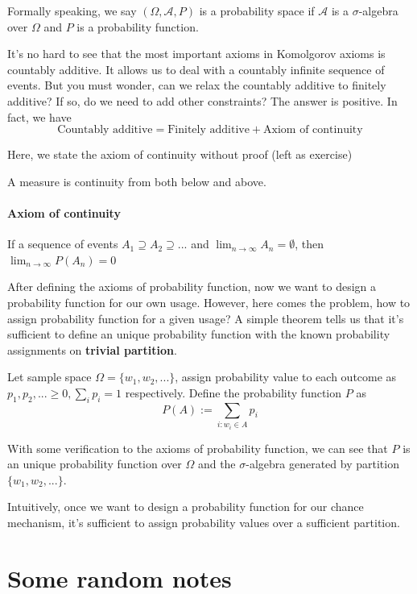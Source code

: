 \documentclass[Probability Theory.tex]{subfiles}
\begin{document}
Formally speaking, we say $(\Omega,\mathcal{A},P)$ is a probability space if $\mathcal{A}$ is a $\sigma$-algebra over $\Omega$ and $P$ is a probability function.

It's no hard to see that the most important axioms in Komolgorov axioms is countably additive. It allows us to deal with a countably infinite sequence of events. But you must wonder, can we relax the countably additive to finitely additive? If so, do we need to add other constraints? The answer is positive. In fact, we have
$$\mbox{Countably additive} = \mbox{Finitely additive} + \mbox{Axiom of continuity}$$

Here, we state the axiom of continuity without proof (left as exercise)
\begin{remark}
A measure is continuity from both below and above.
\end{remark}
\paragraph{Axiom of continuity}
If a sequence of events $A_1\supseteq A_2\supseteq...$ and $\lim_{n\rightarrow\infty}A_n=\emptyset$, then $\lim_{n\rightarrow\infty}P(A_n)=0$

After defining the axioms of probability function, now we want to design a probability function for our own usage. However, here comes the problem, how to assign probability function for a given usage? A simple theorem tells us that it's sufficient to define an unique probability function with the known probability assignments on {\bf trivial partition}.
\begin{theorem}
	Let sample space $\Omega=\{w_1,w_2,...\}$, assign probability value to each outcome as $p_1,p_2,...\geq0, \sum_i p_i=1$ respectively. Define the probability function $P$ as
	$$P(A):=\sum_{i:w_i\in A}p_i$$
\end{theorem}
With some verification to the axioms of probability function, we can see that $P$ is an unique probability function over $\Omega$ and the $\sigma$-algebra generated by partition $\{w_1,w_2,...\}$.

Intuitively, once we want to design a probability function for our chance mechanism, it's sufficient to assign probability values over a sufficient partition.

\section{Some random notes}
\end{document}
